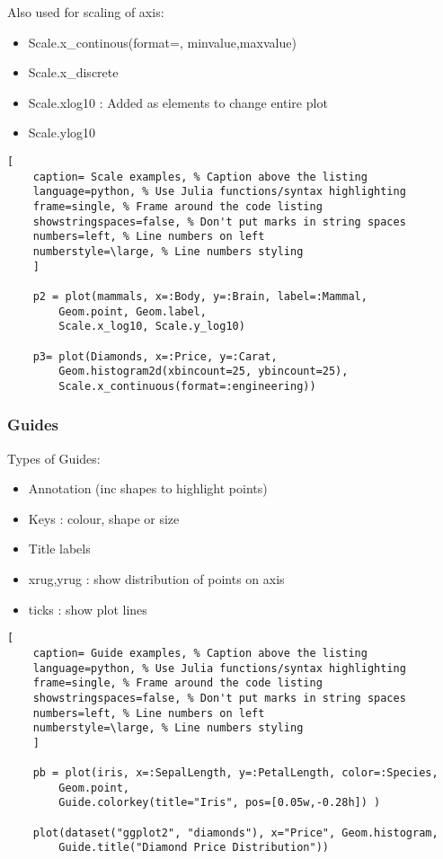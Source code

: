 \documentclass[11pt]{scrartcl} %
\begin{document}
Also used for scaling of axis:

\begin{itemize}
	\item Scale.x\_continous(format=, minvalue,maxvalue)
	\item Scale.x\_discrete
	\item Scale.xlog10 : Added as elements to change entire plot
	\item Scale.ylog10
\end{itemize}

\begin{lstlisting}[
	caption= Scale examples, % Caption above the listing
	language=python, % Use Julia functions/syntax highlighting
	frame=single, % Frame around the code listing
	showstringspaces=false, % Don't put marks in string spaces
	numbers=left, % Line numbers on left
	numberstyle=\large, % Line numbers styling
	]

	p2 = plot(mammals, x=:Body, y=:Brain, label=:Mammal, 
		Geom.point, Geom.label,
		Scale.x_log10, Scale.y_log10)

	p3= plot(Diamonds, x=:Price, y=:Carat, 
		Geom.histogram2d(xbincount=25, ybincount=25),
    	Scale.x_continuous(format=:engineering))

\end{lstlisting}

\subsubsection{Guides}

Types of Guides:
\begin{itemize}
	\item Annotation (inc shapes to highlight points)
	\item Keys : colour, shape or size
	\item Title labels 
	\item xrug,yrug : show distribution of points on axis
	\item ticks : show plot lines
\end{itemize}

\begin{lstlisting}[
	caption= Guide examples, % Caption above the listing
	language=python, % Use Julia functions/syntax highlighting
	frame=single, % Frame around the code listing
	showstringspaces=false, % Don't put marks in string spaces
	numbers=left, % Line numbers on left
	numberstyle=\large, % Line numbers styling
	]

	pb = plot(iris, x=:SepalLength, y=:PetalLength, color=:Species, 
		Geom.point,
        Guide.colorkey(title="Iris", pos=[0.05w,-0.28h]) )

	plot(dataset("ggplot2", "diamonds"), x="Price", Geom.histogram,
		Guide.title("Diamond Price Distribution"))

\end{lstlisting}
\end{document}
